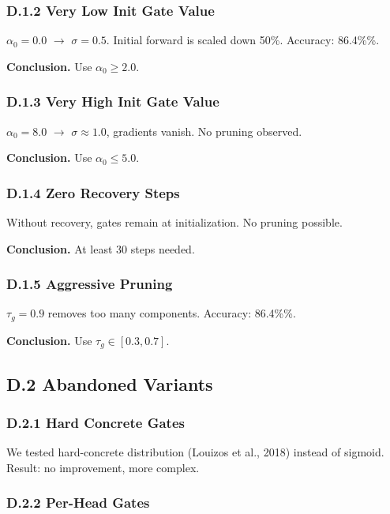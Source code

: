 \subsubsection{D.1.2 Very Low Init Gate Value}

$\alpha_0 = 0.0$ $\to$ $\sigma = 0.5$. Initial forward is scaled down 50\%. 
Accuracy: 86.4\%\%.

\textbf{Conclusion.} Use $\alpha_0 \geq 2.0$.

\subsubsection{D.1.3 Very High Init Gate Value}

$\alpha_0 = 8.0$ $\to$ $\sigma \approx 1.0$, gradients vanish. No pruning 
observed.

\textbf{Conclusion.} Use $\alpha_0 \leq 5.0$.

\subsubsection{D.1.4 Zero Recovery Steps}

Without recovery, gates remain at initialization. No pruning possible.

\textbf{Conclusion.} At least 30 steps needed.

\subsubsection{D.1.5 Aggressive Pruning}

$\tau_g = 0.9$ removes too many components. Accuracy: 86.4\%\%.

\textbf{Conclusion.} Use $\tau_g \in [0.3, 0.7]$.

\subsection{D.2 Abandoned Variants}

\subsubsection{D.2.1 Hard Concrete Gates}

We tested hard-concrete distribution (Louizos et al., 2018) instead of 
sigmoid. Result: no improvement, more complex.

\subsubsection{D.2.2 Per-Head Gates}

